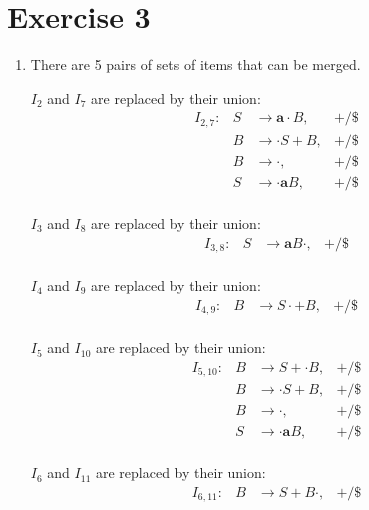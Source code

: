 \documentclass{CompilerAssignment}
\newcommand{\mbfa}{\mathbf{a}}
\begin{document}
\section{Exercise 3}

\begin{enumerate}
    \item There are 5 pairs of sets of items that can be merged.
    
    $I_2$ and $I_7$ are replaced by their union:
    \[
        \begin{aligned}
            &I_{2,7}: &S &\rightarrow \mbfa \cdot B,&+/\$ \\
            & &B &\rightarrow \cdot S + B,&+/\$ \\
            & &B &\rightarrow \cdot,&+/\$ \\
            & &S &\rightarrow \cdot \mbfa B,&+/\$ \\
        \end{aligned}
    \]
    
    $I_3$ and $I_8$ are replaced by their union:
    \[
        \begin{aligned}
            &I_{3,8}: &S &\rightarrow \mbfa B \cdot,&+/\$ \\
        \end{aligned}
    \]

    $I_4$ and $I_9$ are replaced by their union:
    \[
        \begin{aligned}
            &I_{4,9}: &B &\rightarrow S \cdot + B,&+/\$ \\
        \end{aligned}
    \]

    $I_5$ and $I_{10}$ are replaced by their union:
    \[
        \begin{aligned}
            &I_{5,10}: &B &\rightarrow S + \cdot B,&+/\$ \\
            & &B &\rightarrow \cdot S + B,&+/\$ \\
            & &B &\rightarrow \cdot,&+/\$ \\
            & &S &\rightarrow \cdot \mbfa B,&+/\$ \\
        \end{aligned}
    \]

    $I_6$ and $I_{11}$ are replaced by their union:
    \[
        \begin{aligned}
            &I_{6,11}: &B &\rightarrow S + B \cdot,&+/\$ \\
        \end{aligned}
    \]


\end{enumerate}
\end{document}
